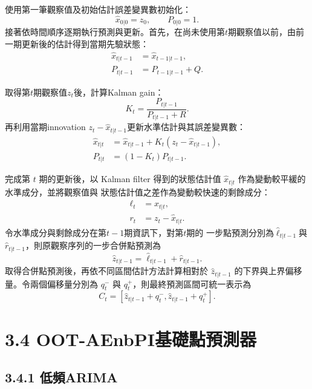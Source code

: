 使用第一筆觀察值及初始估計誤差變異數初始化：
\begin{equation}
 \widehat x_{0|0}=z_0,\qquad P_{0|0}=1.
\end{equation}
接著依時間順序逐期執行預測與更新。首先，在尚未使用第$t$期觀察值以前，由前一期更新後的估計得到當期先驗狀態：
\begin{align}
 \widehat x_{t|t-1}&=\widehat x_{t-1|t-1},\\
 P_{t|t-1}&=P_{t-1|t-1}+Q.
\end{align}

取得第$t$期觀察值$z_t$後，計算Kalman gain：
\begin{equation}
 K_t=\frac{P_{t|t-1}}{P_{t|t-1}+R}.
\end{equation}
再利用當期innovation $z_t-\widehat x_{t|t-1}$更新水準估計與其誤差變異數：
\begin{align}
 \widehat x_{t|t}
 &=\widehat x_{t|t-1}
 +K_t\left(z_t-\widehat x_{t|t-1}\right),\\
 P_{t|t}&=(1-K_t)P_{t|t-1}.
\end{align}

完成第 $t$ 期的更新後，以 Kalman filter 得到的狀態估計值
$\widehat{x}_{t|t}$ 作為變動較平緩的水準成分，並將觀察值與
狀態估計值之差作為變動較快速的剩餘成分：
\begin{align}
    \ell_t &= \widehat{x}_{t|t},\\
    r_t &= z_t-\widehat{x}_{t|t}.
\end{align}
令水準成分與剩餘成分在第$t-1$期資訊下，對第$t$期的
一步點預測分別為$\widehat{\ell}_{t|t-1}$與
$\widehat{r}_{t|t-1}$，則原觀察序列的一步合併點預測為
\begin{equation}
    \widehat{z}_{t|t-1}
    =
    \widehat{\ell}_{t|t-1}
    +
    \widehat{r}_{t|t-1}.
\end{equation}
取得合併點預測後，再依不同區間估計方法計算相對於
$\widehat{z}_{t|t-1}$ 的下界與上界偏移量。令兩個偏移量分別為
$q_t^{-}$ 與 $q_t^{+}$，則最終預測區間可統一表示為
\begin{equation}
    C_t
    =
    \left[
    \widehat{z}_{t|t-1}+q_t^{-},
    \widehat{z}_{t|t-1}+q_t^{+}
    \right].
\end{equation}


\section*{3.4 OOT-AEnbPI基礎點預測器}

\subsection*{3.4.1 低頻ARIMA}

